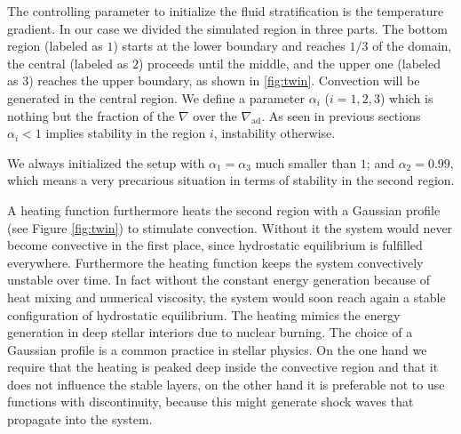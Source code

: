 The controlling parameter to initialize the fluid stratification is the temperature gradient. In our case we divided the simulated region in three parts. The bottom region (labeled as $1$) starts at the lower boundary and reaches $1/3$ of the domain, the central (labeled as $2$) proceeds until the middle, and the upper one (labeled as $3$) reaches the upper boundary, as shown in \ref{fig:twin}. Convection will be generated in the central region.  We define a parameter $\alpha_{i}$ ($i=1, 2, 3$) which is nothing but the fraction of the $\nabla$ over the $\nabla_{\mathrm{ad}}$. As seen in previous sections $\alpha_{i}<1$ implies stability in the region $i$, instability otherwise. 

We always initialized the setup with $\alpha_{1} = \alpha_{3}$ much smaller than $1$; and $\alpha_{2}=0.99$, which means a very precarious situation in terms of stability in the second region. 

A heating function furthermore heats the second region with a Gaussian profile (see Figure \ref{fig:twin}) to stimulate convection. Without it the system would never become convective in the first place, since hydrostatic equilibrium is fulfilled everywhere. Furthermore the heating function keeps the system convectively unstable over time. In fact without the constant energy generation because of heat mixing and numerical viscosity, the system would soon reach again a stable configuration of hydrostatic equilibrium. The heating mimics the energy generation in deep stellar interiors due to nuclear burning. The choice of a Gaussian profile is a common practice in stellar physics. On the one hand we require that the heating is peaked deep inside the convective region and that it does not influence the stable layers, on the other hand it is preferable not to use functions with discontinuity, because this might generate shock waves that propagate into the system.



